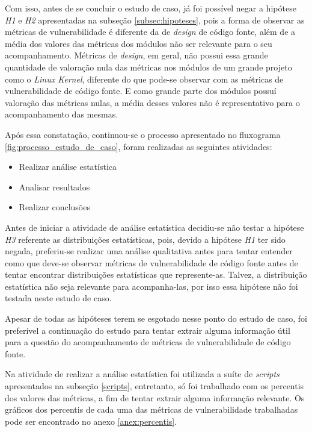 Com isso, antes de se concluir o estudo de caso, já foi
possível negar a hipótese \emph{H1} e \emph{H2} apresentadas na subseção
\ref{subsec:hipoteses}, pois a forma de observar as métricas de vulnerabilidade
é diferente da de \textit{design} de código fonte, além de a média dos valores
das métricas dos módulos não ser relevante para o seu acompanhamento. Métricas de \textit{design},
em geral, não possui essa grande quantidade de valoração nula das métricas nos
módulos de um grande projeto como o \emph{Linux Kernel}, diferente do que
pode-se observar com as métricas de vulnerabilidade de código fonte. E como
grande parte dos módulos possuí valoração das métricas nulas, a média desses
valores não é representativo para o acompanhamento das mesmas.

Após essa constatação, continuou-se o processo apresentado no fluxograma 
\ref{fig:processo_estudo_de_caso}, foram realizadas as seguintes atividades:

\begin{itemize}
  \item Realizar análise estatística
  \item Analisar resultados
  \item Realizar conclusões
\end{itemize}

Antes de iniciar a atividade de análise estatística decidiu-se não testar a
hipótese \emph{H3} referente as distribuições estatísticas, pois, devido a
hipótese \emph{H1} ter sido negada, preferiu-se realizar uma análise qualitativa
antes para tentar entender como que deve-se observar métricas de vulnerabilidade de código
fonte antes de tentar encontrar distribuições estatísticas que represente-as.
Talvez, a distribuição estatística não seja relevante para acompanha-las, por
isso essa hipótese não foi testada neste estudo de caso.

Apesar de todas as hipóteses terem se esgotado nesse ponto do estudo de caso,
foi preferível a continuação do estudo para tentar extrair alguma informação
útil para a questão do acompanhamento de métricas de vulnerabilidade de código
fonte.

Na atividade de realizar a análise estatística foi utilizada a suíte de
\textit{scripts} apresentados na subseção \ref{scripts}, entretanto, só foi
trabalhado com os percentis dos valores das métricas, a fim de tentar extrair
alguma informação relevante. Os gráficos dos percentis de cada uma das métricas 
de vulnerabilidade trabalhadas pode ser encontrado no anexo \ref{anex:percentis}.

